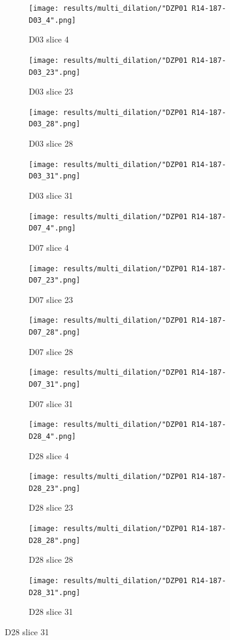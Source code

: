 \begin{figure}[!htb]  
    \centering %
\begin{subfigure}{0.25\textwidth}
  \texttt{[image: results/multi\_dilation/"DZP01 R14-187-D03\_4".png]}
  \caption{D03 slice 4}
\end{subfigure}\hfil %
\begin{subfigure}{0.25\textwidth}
  \texttt{[image: results/multi\_dilation/"DZP01 R14-187-D03\_23".png]}
  \caption{D03 slice 23}
\end{subfigure}\hfil %
\begin{subfigure}{0.25\textwidth}
  \texttt{[image: results/multi\_dilation/"DZP01 R14-187-D03\_28".png]}
  \caption{D03 slice 28}
\end{subfigure}\hfil %
\begin{subfigure}{0.25\textwidth}
  \texttt{[image: results/multi\_dilation/"DZP01 R14-187-D03\_31".png]}
  \caption{D03 slice 31}
\end{subfigure}

\medskip
\begin{subfigure}{0.25\textwidth}
  \texttt{[image: results/multi\_dilation/"DZP01 R14-187-D07\_4".png]}
  \caption{D07 slice 4}
\end{subfigure}\hfil %
\begin{subfigure}{0.25\textwidth}
  \texttt{[image: results/multi\_dilation/"DZP01 R14-187-D07\_23".png]}
  \caption{D07 slice 23}
\end{subfigure}\hfil %
\begin{subfigure}{0.25\textwidth}
  \texttt{[image: results/multi\_dilation/"DZP01 R14-187-D07\_28".png]}
  \caption{D07 slice 28}
\end{subfigure}\hfil %
\begin{subfigure}{0.25\textwidth}
  \texttt{[image: results/multi\_dilation/"DZP01 R14-187-D07\_31".png]}
  \caption{D07 slice 31}
\end{subfigure}

\medskip
\begin{subfigure}{0.25\textwidth}
  \texttt{[image: results/multi\_dilation/"DZP01 R14-187-D28\_4".png]}
  \caption{D28 slice 4}
\end{subfigure}\hfil %
\begin{subfigure}{0.25\textwidth}
  \texttt{[image: results/multi\_dilation/"DZP01 R14-187-D28\_23".png]}
  \caption{D28 slice 23}
\end{subfigure}\hfil %
\begin{subfigure}{0.25\textwidth}
  \texttt{[image: results/multi\_dilation/"DZP01 R14-187-D28\_28".png]}
  \caption{D28 slice 28}
\end{subfigure}\hfil %
\begin{subfigure}{0.25\textwidth}
  \texttt{[image: results/multi\_dilation/"DZP01 R14-187-D28\_31".png]}
  \caption{D28 slice 31}
\end{subfigure}
  

\end{figure}
